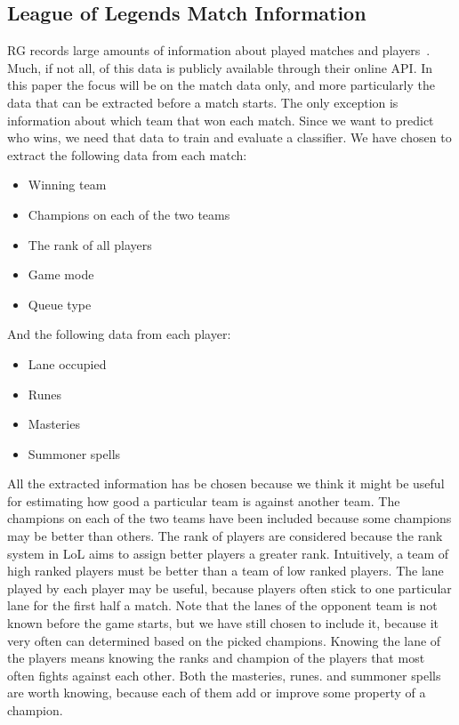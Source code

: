 \subsection{League of Legends Match Information}\label{sec:matchdata}
RG records large amounts of information about played matches and players~\cite{matchinfo}. Much, if not all, of this data is publicly available through their online API. In this paper the focus will be on the match data only, and more particularly the data that can be extracted before a match starts. The only exception is information about which team that won each match. Since we want to predict who wins, we need that data to train and evaluate a classifier.
We have chosen to extract the following data from each match:
\begin{itemize}
\item Winning team
\item Champions on each of the two teams
\item The rank of all players
\item Game mode
\item Queue type
\end{itemize}
And the following data from each player:
\begin{itemize}
\item Lane occupied 
\item Runes 
\item Masteries 
\item Summoner spells 
\end{itemize}
All the extracted information has be chosen because we think it might be useful for estimating how good a particular team is against another team. 
The champions on each of the two teams have been included because some champions may be better than others.
The rank of players are considered because the rank system in LoL aims to assign better players a greater rank. Intuitively, a team of high ranked players must be better than a team of low ranked players.
The lane played by each player may be useful, because players often stick to one particular lane for the first half a match.
Note that the lanes of the opponent team is not known before the game starts, but we have still chosen to include it, because it very often can determined based on the picked champions. Knowing the lane of the players means knowing the ranks and champion of the players that most often fights against each other.
Both the masteries, runes. and summoner spells are worth knowing, because each of them add or improve some property of a champion. 
